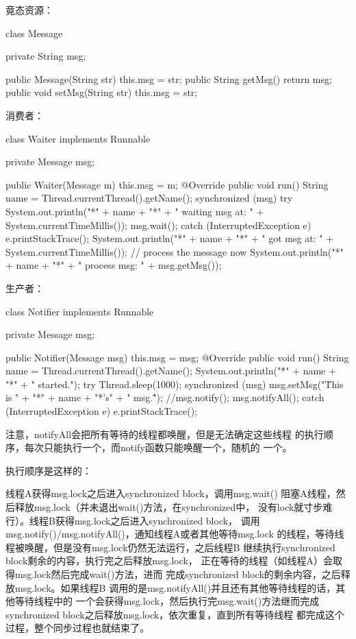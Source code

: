 竟态资源：

\begin{javacode}
class Message {
  private String msg;

  public Message(String str) {
    this.msg = str;
  }
  public String getMsg() {
    return msg;
  }
  public void setMsg(String str) {
    this.msg = str;
  }
}
\end{javacode}

消费者：

\begin{javacode}
class Waiter implements Runnable {
  private Message msg;

  public Waiter(Message m) {
    this.msg = m;
  }
  @Override
  public void run() {
    String name = Thread.currentThread().getName();
    synchronized (msg) {
      try {
        System.out.println("*" + name + "*" + " waiting msg at: "
                           + System.currentTimeMillis());
        msg.wait();
      } catch (InterruptedException e) {
        e.printStackTrace();
      }
      System.out.println("*" + name + "*" + " got msg at: "
                         + System.currentTimeMillis());
      // process the message now
      System.out.println("*" + name + "*" + " process msg: " + msg.getMsg());
    }
  }
}
\end{javacode}

生产者：

\begin{javacode}
class Notifier implements Runnable {
  private Message msg;

  public Notifier(Message msg) {
    this.msg = msg;
  }
  @Override
  public void run() {
    String name = Thread.currentThread().getName();
    System.out.println("*" + name + "*" + " started.");
    try {
      Thread.sleep(1000);
      synchronized (msg) {
        msg.setMsg("\"This is " + "*" + name + "*'s" + " msg.\"");
        //msg.notify();
        msg.notifyAll();
      }
    } catch (InterruptedException e) {
      e.printStackTrace();
    }
  }
}
\end{javacode}

注意，notifyAll会把所有等待的线程都唤醒，但是无法确定这些线程
的执行顺序，每次只能执行一个，而notify函数只能唤醒一个，随机的
一个。

执行顺序是这样的：

线程A获得msg.lock之后进入synchronized block，调用msg.wait()
阻塞A线程，然后释放msg.lock（并未退出wait()方法，在synchronized中，
没有lock就寸步难行）。线程B获得msg.lock之后进入synchronized block，
调用msg.notify()/msg.notifyAll()，通知线程A或者其他等待msg.lock
的线程，等待线程被唤醒，但是没有msg.lock仍然无法运行，之后线程B
继续执行synchronized block剩余的内容，执行完之后释放msg.lock，
正在等待的线程（如线程A）会取得msg.lock然后完成wait()方法，进而
完成synchronized block的剩余内容，之后释放msg.lock。如果线程B
调用的是msg.notifyAll()并且还有其他等待线程的话，其他等待线程中的
一个会获得msg.lock，然后执行完msg.wait()方法继而完成
synchronized block之后释放msg.lock，依次重复，直到所有等待线程
都完成这个过程，整个同步过程也就结束了。
